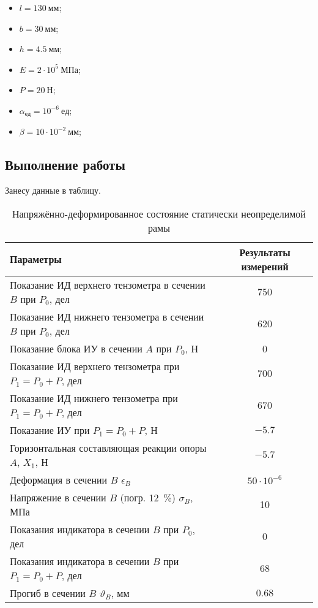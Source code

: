 \begin{itemize}
    \item $l = 130~мм$;
    \item $b = 30~мм$;
    \item $h = 4.5~мм$;
    \item $E = 2 \cdot 10^5~МПа$;
    \item $P = 20~Н$;
    \item $\alpha_{ед} = 10^{-6}~ед$;
    \item $\beta = 10 \cdot 10^{-2}~мм$;
\end{itemize}

\subsection{Выполнение работы}

Занесу данные в таблицу.
\begin{table}[H]
    \centering
    \caption{Напряжённо-деформированное состояние статически неопределимой рамы}
    \label{tab:static-undefinable-beam}
    \begin{tabular}{|l|c|}
        \hline
        Параметры                                                     & Результаты измерений \\ \hline
        Показание ИД верхнего тензометра в сечении $B$ при $P_0$, дел & 750                  \\ \hline
        Показание ИД нижнего тензометра в сечении $B$ при $P_0$, дел  & 620                  \\ \hline
        Показание блока ИУ в сечении $A$ при $P_0$, Н                 & 0                    \\ \hline
        Показание ИД верхнего тензометра при $P_1 = P_0 + P$, дел     & 700                  \\ \hline
        Показание ИД нижнего тензометра при $P_1 = P_0 + P$, дел      & 670                  \\ \hline
        Показание ИУ при $P_1 = P_0 + P$, Н                           & $-5.7$               \\ \hline
        Горизонтальная составляющая реакции опоры $A$, $X_1$, Н       & $-5.7$               \\ \hline
        Деформация в сечении $B$ $\epsilon_B$                         & $50 \cdot 10^{-6}$   \\ \hline
        Напряжение в сечении $B$ (погр. 12~\%) $\sigma_B$, МПа        & 10                   \\ \hline
        Показания индикатора в сечении $B$ при $P_0$, дел             & 0                    \\ \hline
        Показания индикатора в сечении $B$ при $P_1 = P_0 + P$, дел   & 68                   \\ \hline
        Прогиб в сечении $B$ $\vartheta_B$, мм                        & $0.68$               \\ \hline
    \end{tabular}
\end{table}

